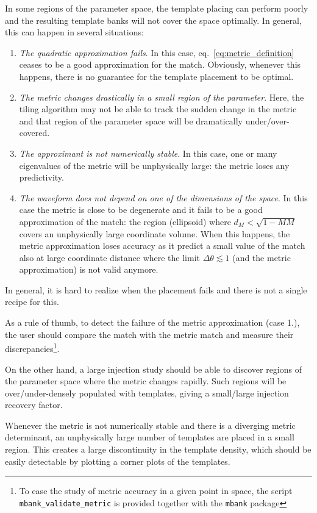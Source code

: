 \documentclass[twocolumn,showpacs,preprintnumbers,nofootinbib,prd,
superscriptaddress,10pt]{revtex4-2}
\begin{document}
In some regions of the parameter space, the template placing can perform poorly and the resulting template banks will not cover the space optimally.
In general, this can happen in several situations:

\begin{enumerate}
	\item {\it The quadratic approximation fails}. In this case, eq.~\eqref{eq:metric_definition} ceases to be a good approximation for the match. Obviously, whenever this happens, there is no guarantee for the template placement to be optimal.
	\item {\it The metric changes drastically in a small region of the parameter}. Here, the tiling algorithm may not be able to track the sudden change in the metric and that region of the parameter space will be dramatically under/over-covered.
	\item {\it The approximant is not numerically stable}. In this case, one or many eigenvalues of the metric will be unphysically large: the metric loses any predictivity.
	\item {\it The waveform does not depend on one of the dimensions of the space}. In this case the metric is close to be degenerate and it fails to be a good approximation of the match: the region (ellipsoid) where $d_M<\sqrt{1-MM}$ covers an unphysically large coordinate volume. When this happens, the metric approximation loses accuracy as it predict a small value of the match also at large coordinate distance where the limit $\Delta\theta \lesssim 1$ (and the metric approximation) is not valid anymore.
\end{enumerate}

In general, it is hard to realize when the placement fails and there is not a single recipe for this.

As a rule of thumb, to detect the failure of the metric approximation (case 1.), the user should compare the match with the metric match and measure their discrepancies\footnote{To ease the study of metric accuracy in a given point in space, the script \texttt{mbank\_validate\_metric} is provided together with the \texttt{mbank} package}.

On the other hand, a large injection study should be able to discover regions of the parameter space where the metric changes rapidly. Such regions will be over/under-densely populated with templates, giving a small/large injection recovery factor.

Whenever the metric is not numerically stable and there is a diverging metric determinant, an unphysically large number of templates are placed in a small region. This creates a large discontinuity in the template density, which should be easily detectable by plotting a corner plots of the templates.
\end{document}
